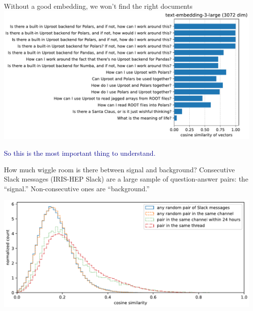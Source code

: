 \documentclass[aspectratio=169]{beamer}
\begin{document}
\begin{frame}{Without a good embedding, we won't find the right documents}
\vspace{0.5 cm}
\includegraphics[width=\linewidth]{PLOTS/experiments-with-similarity.pdf}

\vspace{-0.75 cm}
\textcolor{darkblue}{So this is the most important thing to understand.}
\vspace{0.75 cm}
\end{frame}

\begin{frame}{How much wiggle room is there between signal and background?}
\large
\vspace{0.5 cm}
Consecutive Slack messages (IRIS-HEP Slack) are a large sample of question-answer pairs: the ``signal.'' Non-consecutive ones are ``background.''

\vspace{0.25 cm}
\includegraphics[width=\linewidth]{PLOTS/slack-similarity-in-and-out-of-threads.pdf}
\end{frame}
\end{document}
